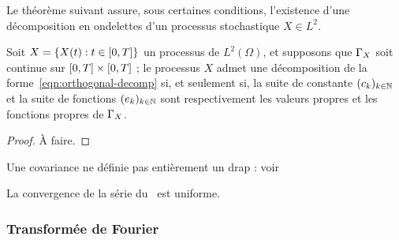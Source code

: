 Le théorème suivant assure, sous certaines conditions, l'existence
d'une \og décomposition en ondelettes\fg{} d'un processus stochastique
$X\in L^2$.

\begin{theoreme}
  \label{thm:orthogonal-decomp}
  Soit $X = \{X(t) : t\in\left[0,T\right]\}$ un processus de $L^2(\Omega)$,
  et supposons que $\Gamma_X$ soit continue sur
  $\left[0,T\right]\times\left[0,T\right]$ ; le processus $X$ admet une
  décomposition de la forme~\ref{eqn:orthogonal-decomp} si, et
  seulement si, la suite de constante $(c_k)_{k\in\mathbb{N}}$ et la suite de
  fonctions $(e_k)_{k\in\mathbb{N}}$ sont respectivement les valeurs propres
  et les fonctions propres de $\Gamma_X$.
\end{theoreme}
\begin{alert}
  \begin{proof}
    À faire.
  \end{proof}
\end{alert}

\begin{alert}
  Une covariance ne définie pas entièrement un drap :
  voir~\cite{herbin2002}
\end{alert}

\begin{remarque}
  La convergence de la série du~ est
  uniforme.
\end{remarque}

\subsubsection*{Transformée de Fourier}
